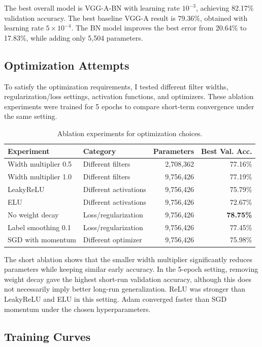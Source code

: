 \documentclass[11pt,a4paper]{article}
\begin{document}
The best overall model is VGG-A-BN with learning rate $10^{-3}$, achieving
82.17\% validation accuracy. The best baseline VGG-A result is 79.36\%, obtained
with learning rate $5\times10^{-4}$. The BN model improves the best error from
20.64\% to 17.83\%, while adding only 5,504 parameters.

\subsection{Optimization Attempts}

To satisfy the optimization requirements, I tested different filter widths,
regularization/loss settings, activation functions, and optimizers. These
ablation experiments were trained for 5 epochs to compare short-term convergence
under the same setting.

\begin{table}[H]
\centering
\caption{Ablation experiments for optimization choices.}
\small
\begin{tabular}{llrr}
\toprule
Experiment & Category & Parameters & Best Val. Acc. \\
\midrule
Width multiplier 0.5 & Different filters & 2,708,362 & 77.16\% \\
Width multiplier 1.0 & Different filters & 9,756,426 & 77.19\% \\
LeakyReLU & Different activations & 9,756,426 & 75.79\% \\
ELU & Different activations & 9,756,426 & 72.67\% \\
No weight decay & Loss/regularization & 9,756,426 & \textbf{78.75\%} \\
Label smoothing 0.1 & Loss/regularization & 9,756,426 & 77.45\% \\
SGD with momentum & Different optimizer & 9,756,426 & 75.98\% \\
\bottomrule
\end{tabular}
\end{table}

The short ablation shows that the smaller width multiplier significantly reduces
parameters while keeping similar early accuracy. In the 5-epoch setting, removing
weight decay gave the highest short-run validation accuracy, although this does
not necessarily imply better long-run generalization. ReLU was stronger than
LeakyReLU and ELU in this setting. Adam converged faster than SGD momentum under
the chosen hyperparameters.

\subsection{Training Curves}
\end{document}
